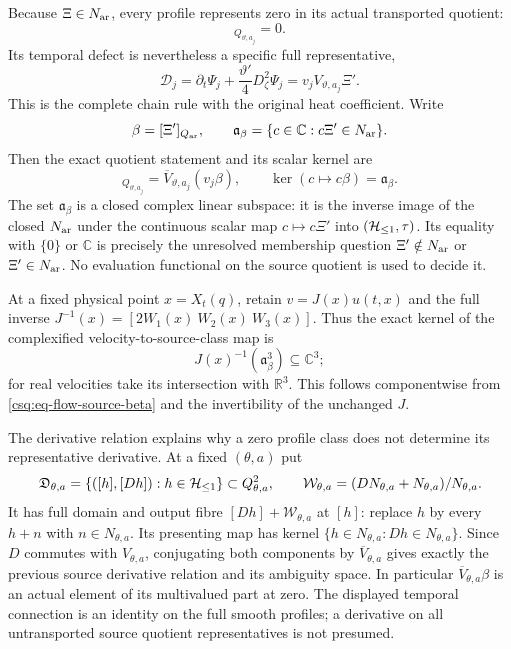 Because $\Xi\in N_{\rm ar}$, every profile represents zero in its actual
transported quotient:
\begin{equation}
 [\Psi_j]_{Q_{\vartheta,a_j}}=0.
 \label{csq:eq-flow-profile-zero}
\end{equation}
Its temporal defect is nevertheless a specific full representative,
\[
 \mathcal D_j=\partial_t\Psi_j+
              \frac{\vartheta'}4D_\zeta^2\Psi_j
             =v_jV_{\vartheta,a_j}\Xi'.
\]
This is the complete chain rule with the original heat coefficient.
Write
\[
 \beta=[\Xi']_{Q_{\rm ar}},\qquad
 \mathfrak a_\beta=\{c\in\mathbb C:c\Xi'\in N_{\rm ar}\}.
\]
Then the exact quotient statement and its scalar kernel are
\begin{equation}
 [\mathcal D_j]_{Q_{\vartheta,a_j}}
    =\overline V_{\vartheta,a_j}(v_j\beta),\qquad
 \ker(c\mapsto c\beta)=\mathfrak a_\beta .
 \label{csq:eq-flow-source-beta}
\end{equation}
The set $\mathfrak a_\beta$ is a closed complex linear subspace:
it is the inverse image of the closed $N_{\rm ar}$ under the continuous
scalar map $c\mapsto c\Xi'$ into $(\mathcal H_{\leq 1},\tau)$.
Its equality with $\{0\}$ or $\mathbb C$ is precisely the unresolved
membership question $\Xi'\notin N_{\rm ar}$ or $\Xi'\in N_{\rm ar}$.
No evaluation functional on the source quotient is used to decide it.

At a fixed physical point $x=X_t(q)$, retain
$v=J(x)u(t,x)$ and the full inverse
$J^{-1}(x)=[2W_1(x)\ W_2(x)\ W_3(x)]$. Thus the exact kernel of
the complexified velocity-to-source-class map is
\[
 J(x)^{-1}(\mathfrak a_\beta^3)\subseteq\mathbb C^3;
\]
for real velocities take its intersection with $\mathbb R^3$.
This follows componentwise from \eqref{csq:eq-flow-source-beta} and
the invertibility of the unchanged $J$.

The derivative relation explains why a zero profile class does not
determine its representative derivative. At a fixed $(\theta,a)$ put
\[
 \mathfrak D_{\theta,a}
 =\{([h],[Dh]):h\in\mathcal H_{\leq 1}\}\subset Q_{\theta,a}^2,\qquad
 \mathcal W_{\theta,a}
 =(DN_{\theta,a}+N_{\theta,a})/N_{\theta,a}.
\]
It has full domain and output fibre $[Dh]+\mathcal W_{\theta,a}$
at $[h]$: replace $h$ by every $h+n$ with $n\in N_{\theta,a}$.
Its presenting map has kernel
$\{h\in N_{\theta,a}:Dh\in N_{\theta,a}\}$.
Since $D$ commutes with $V_{\theta,a}$, conjugating both components
by $\overline V_{\theta,a}$ gives exactly the previous source
derivative relation and its ambiguity space. In particular
$\overline V_{\theta,a}\beta$ is an actual element of its
multivalued part at zero. The displayed temporal connection is an
identity on the full smooth profiles; a derivative on all
untransported source quotient representatives is not presumed.

